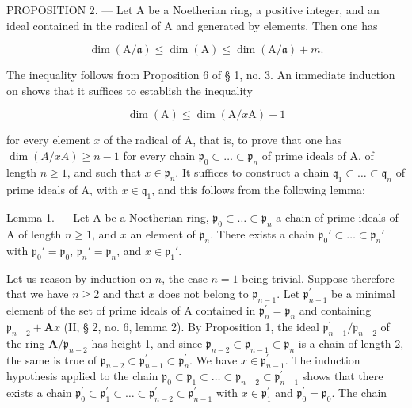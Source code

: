 PROPOSITION 2. --- Let A be a Noetherian ring,  a positive integer, and  an ideal contained in the radical of A and generated by  elements. Then one has

\[
\dim (\mathrm{A} / \mathfrak {a}) \leqslant \dim (\mathrm{A}) \leqslant \dim (\mathrm{A} / \mathfrak {a}) + m.\tag{4}
\]

The inequality  follows from Proposition 6 of § 1, no. 3. An immediate induction on  shows that it suffices to establish the inequality

\[
\dim (\mathrm{A}) \leqslant \dim (\mathrm{A} / x \mathrm{A}) + 1\tag{5}
\]

for every element \(x\) of the radical of A, that is, to prove that one has \(\dim(A/xA) \geqslant n - 1\) for every chain \(\mathfrak{p}_0 \subset \ldots \subset \mathfrak{p}_n\) of prime ideals of A, of length \(n \geqslant 1\), and such that \(x \in \mathfrak{p}_n\). It suffices to construct a chain \(\mathfrak{q}_1 \subset \ldots \subset \mathfrak{q}_n\) of prime ideals of A, with \(x \in \mathfrak{q}_1\), and this follows from the following lemma:

Lemma 1. --- Let A be a Noetherian ring, \(\mathfrak{p}_{0} \subset \ldots \subset \mathfrak{p}_{n}\) a chain of prime ideals of A of length \(n \geqslant 1\), and \(x\) an element of \(\mathfrak{p}_{n}\). There exists a chain \(\mathfrak{p}_{0}' \subset \ldots \subset \mathfrak{p}_{n}'\) with \(\mathfrak{p}_{0}' = \mathfrak{p}_{0}\), \(\mathfrak{p}_{n}' = \mathfrak{p}_{n}\), and \(x \in \mathfrak{p}_{1}'\).

Let us reason by induction on \(n\), the case \(n=1\) being trivial. Suppose therefore that we have \(n\geqslant2\) and that \(x\) does not belong to \(\mathfrak{p}_{n-1}\). Let \(\mathfrak{p}_{n-1}^{\prime}\) be a minimal element of the set of prime ideals of A contained in \(\mathfrak{p}_{n}^{\prime}=\mathfrak{p}_{n}\) and containing \(\mathfrak{p}_{n-2}+\mathbf{A}x\) (II, § 2, no. 6, lemma 2). By Proposition 1, the ideal \(\mathfrak{p}_{n-1}^{\prime}/\mathfrak{p}_{n-2}\) of the ring \(\mathbf{A}/\mathfrak{p}_{n-2}\) has height 1, and since \(\mathfrak{p}_{n-2}\subset\mathfrak{p}_{n-1}\subset\mathfrak{p}_{n}\) is a chain of length 2, the same is true of \(\mathfrak{p}_{n-2}\subset\mathfrak{p}_{n-1}^{\prime}\subset\mathfrak{p}_{n}^{\prime}\). We have \(x\in\mathfrak{p}_{n-1}^{\prime}\). The induction hypothesis applied to the chain \(\mathfrak{p}_{0}\subset\mathfrak{p}_{1}\subset\ldots\subset\mathfrak{p}_{n-2}\subset\mathfrak{p}_{n-1}^{\prime}\) shows that there exists a chain \(\mathfrak{p}_{0}^{\prime}\subset\mathfrak{p}_{1}^{\prime}\subset\ldots\subset\mathfrak{p}_{n-2}^{\prime}\subset\mathfrak{p}_{n-1}^{\prime}\) with \(x\in\mathfrak{p}_{1}^{\prime}\) and \(\mathfrak{p}_{0}^{\prime}=\mathfrak{p}_{0}\). The chain

